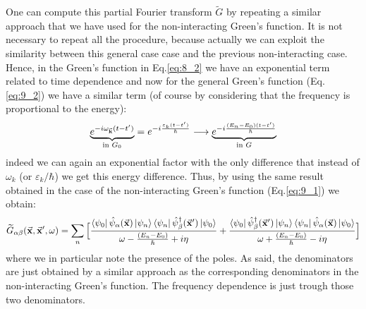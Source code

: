 \documentclass[../main/main.tex]{subfiles}
\begin{document}
One can compute this partial Fourier transform \( \widetilde{G}  \) by repeating a similar approach that we have used for the non-interacting Green's function. It is not necessary to repeat all the procedure, because actually we can exploit the similarity between this general case case and the previous non-interacting case.
Hence, in the Green's function in Eq.\eqref{eq:8_2} we have an exponential term related to time dependence and now for the general Green's function (Eq.\eqref{eq:9_2}) we have a similar term (of course by considering that the frequency is proportional to the energy):
\begin{equation*}
  \underbrace{e^{-i \omega _{\va{k}} (t-t')}}_{\text{in } G_0} = e^{-i \frac{\varepsilon _k (t-t')}{\hbar }}
  \longrightarrow  \underbrace{e^{-i \frac{(E_n-E_0)(t-t')}{\hbar }}  }_{ \text{in } G}
\end{equation*}
indeed we can again an exponential factor with the only difference that instead of \( \omega _k \) (or \( \varepsilon _k/\hbar  \)) we get this energy difference.
Thus, by using the same result obtained in the case of the non-interacting Green's function (Eq.\eqref{eq:9_1}) we obtain:
\begin{equation}
\begin{split}
\widetilde{G}_{\alpha \beta } (\va{x},\va{x}', \omega )   &=
\sum_{n}^{} \Big[ \frac{\bra{\psi _0} \hat{\psi }_ \alpha
 (\va{x}) \ket{\psi _n} \bra{\psi _n} \hat{\psi }_ \beta ^\dag (\va{x}') \ket{\psi _0}  }{\omega - \frac{(E_n-E_0)}{\hbar } + i \eta }
 +   \frac{\bra{\psi _0} \hat{\psi }_ \beta ^\dag (\va{x}') \ket{\psi _n} \bra{\psi _n}  \hat{\psi }_ \alpha
  (\va{x})  \ket{\psi _0}  }{\omega + \frac{(E_n-E_0)}{\hbar } - i \eta } \Big] \\
\end{split}
\label{eq:9_3}
\end{equation}
where we in particular note the presence of the poles.
As said, the denominators are just obtained by a similar approach as the corresponding denominators in the non-interacting Green's function. The frequency dependence is just trough those two denominators.
\end{document}
